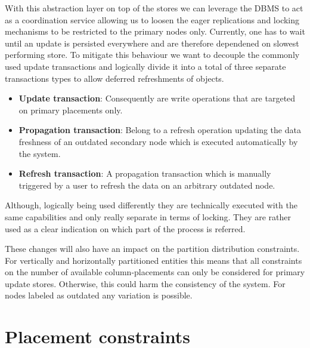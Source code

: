 With this abstraction layer on top of the stores we can leverage the DBMS to act as a coordination service allowing us to loosen the eager replications and 
locking mechanisms to be restricted to the primary nodes only. Currently, one has to wait until an update is persisted everywhere and are therefore
dependened on slowest performing store.
To mitigate this behaviour we want to decouple the commonly used update transactions and logically divide it into a total of three separate transactions types
to allow deferred refreshments of objects.
\begin{itemize}
    \item \textbf{Update transaction}: Consequently are write operations that are targeted on primary placements only.
    \item \textbf{Propagation transaction}: Belong to a refresh operation updating the data freshness of an outdated secondary node which is 
    executed automatically by the system.
    \item \textbf{Refresh transaction}: A propagation transaction which is manually triggered by a user to refresh the data on an arbitrary outdated node.
\end{itemize}

Although, logically being used differently they are technically executed with the same capabilities and only really separate in terms of locking.
They are rather used as a clear indication on which part of the process is referred.

These changes will also have an impact on the partition distribution constraints. For vertically and horizontally partitioned 
entities this means that all constraints on the number of available column-placements can only be considered for primary update stores. Otherwise, this could harm
the consistency of the system. For nodes labeled as outdated any variation is possible.

\section{Placement constraints}
